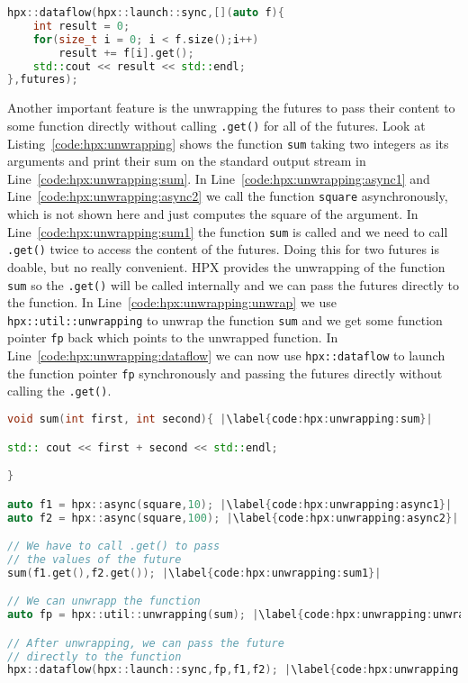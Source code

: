 \begin{lstlisting}[language=c++,caption={Usage of \lstinline|hpx::dataflow| for the continuation of futures.\label{code:hpx:dataflow}},float,floatplacement=htb,escapechar=|]
hpx::dataflow(hpx::launch::sync,[](auto f){
    int result = 0;
    for(size_t i = 0; i < f.size();i++)
        result += f[i].get();
    std::cout << result << std::endl;
},futures);
\end{lstlisting}



Another important feature is the unwrapping the futures to pass their content to some function directly without calling \lstinline|.get()| for all of the futures. Look at Listing~\ref{code:hpx:unwrapping} shows the function \lstinline|sum| taking two integers as its arguments and print their sum on the standard output stream in Line~\ref{code:hpx:unwrapping:sum}. In Line~\ref{code:hpx:unwrapping:async1} and Line~\ref{code:hpx:unwrapping:async2} we call the function \lstinline|square| asynchronously, which is not shown here and just computes the square of the argument. In Line~\ref{code:hpx:unwrapping:sum1} the function \lstinline|sum| is called and we need to call \lstinline|.get()| twice to access the content of the futures. Doing this for two futures is doable, but no really convenient. HPX provides the unwrapping of the function \lstinline|sum| so the \lstinline|.get()| will be called internally and we can pass the futures directly to the function. In Line~\ref{code:hpx:unwrapping:unwrap} we use \lstinline|hpx::util::unwrapping| to unwrap the function \lstinline|sum| and we get some function pointer \lstinline|fp| back which points to the unwrapped function. In Line~\ref{code:hpx:unwrapping:dataflow} we can now use \lstinline|hpx::dataflow| to launch the function pointer \lstinline|fp| synchronously and passing the futures directly without calling the \lstinline|.get()|. 


\begin{lstlisting}[language=c++,caption={Unwrapping a function to pass futures without calling \lstinline|.get()|.\label{code:hpx:unwrapping}},float,floatplacement=htb,escapechar=|]
void sum(int first, int second){ |\label{code:hpx:unwrapping:sum}|

std:: cout << first + second << std::endl;

}

auto f1 = hpx::async(square,10); |\label{code:hpx:unwrapping:async1}|
auto f2 = hpx::async(square,100); |\label{code:hpx:unwrapping:async2}|

// We have to call .get() to pass 
// the values of the future
sum(f1.get(),f2.get()); |\label{code:hpx:unwrapping:sum1}|

// We can unwrapp the function
auto fp = hpx::util::unwrapping(sum); |\label{code:hpx:unwrapping:unwrap}|

// After unwrapping, we can pass the future
// directly to the function
hpx::dataflow(hpx::launch::sync,fp,f1,f2); |\label{code:hpx:unwrapping:dataflow}|

\end{lstlisting}



